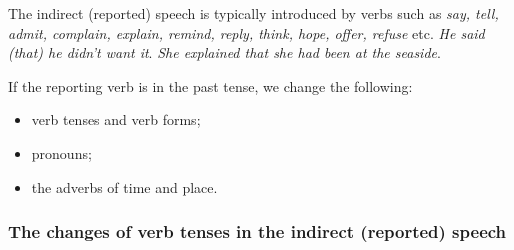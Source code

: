 The indirect (reported) speech is typically introduced by verbs such as \textit{say, tell, admit, complain, explain, remind, reply, think, hope, offer, refuse} etc. \textit{He said (that) he didn't want it}. \textit{She explained that she had been at the seaside}.

If the reporting verb is in the past tense, we change the following:

\begin{itemize}

\item verb tenses and verb forms;
\item pronouns;
\item the adverbs of time and place.
\end{itemize}

\subsubsection{The changes of verb tenses in the indirect (reported) speech}

